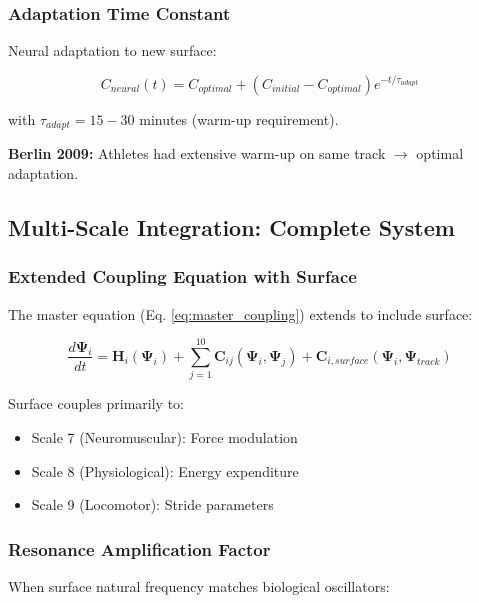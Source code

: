 \subsubsection{Adaptation Time Constant}

Neural adaptation to new surface:

\begin{equation}
C_{neural}(t) = C_{optimal} + (C_{initial} - C_{optimal}) e^{-t/\tau_{adapt}}
\label{eq:neural_adaptation}
\end{equation}

with $\tau_{adapt} = 15-30$ minutes (warm-up requirement).

\textbf{Berlin 2009:} Athletes had extensive warm-up on same track $\to$ optimal adaptation.

\subsection{Multi-Scale Integration: Complete System}

\subsubsection{Extended Coupling Equation with Surface}

The master equation (Eq. \ref{eq:master_coupling}) extends to include surface:

\begin{equation}
\frac{d\mathbf{\Psi}_i}{dt} = \mathbf{H}_i(\mathbf{\Psi}_i) + \sum_{j=1}^{10} \mathbf{C}_{ij}(\mathbf{\Psi}_i, \mathbf{\Psi}_j) + \mathbf{C}_{i,surface}(\mathbf{\Psi}_i, \mathbf{\Psi}_{track})
\label{eq:master_coupling_with_surface}
\end{equation}

Surface couples primarily to:
\begin{itemize}
\item Scale 7 (Neuromuscular): Force modulation
\item Scale 8 (Physiological): Energy expenditure
\item Scale 9 (Locomotor): Stride parameters
\end{itemize}

\subsubsection{Resonance Amplification Factor}

When surface natural frequency matches biological oscillators:

